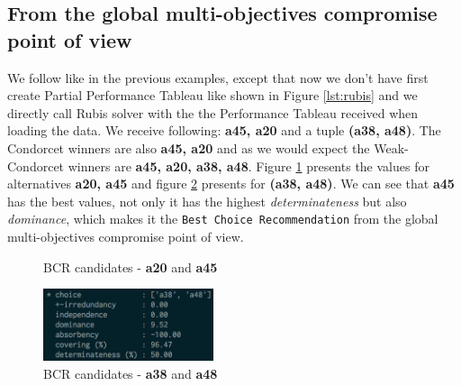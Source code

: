 \documentclass[a4paper]{article}
\begin{document}
\subsection{From the global multi-objectives compromise point of view}
\label{sec:global}

We follow like in the previous examples, except that now we don't have first create Partial Performance Tableau like shown in Figure \ref*{lst:rubis} and we directly call Rubis solver with the the Performance Tableau received when loading the data. We receive following: \textbf{a45, a20} and a tuple \textbf{(a38, a48)}. The Condorcet winners are also \textbf{a45, a20} and as we would expect the Weak-Condorcet winners are \textbf{a45, a20, a38, a48}. Figure \ref{fig:20and45} presents the values for alternatives \textbf{a20, a45} and figure \ref{fig:38_48} presents for \textbf{(a38, a48)}. We can see that \textbf{a45} has the best values, not only it has the highest \emph{determinateness} but also \emph{dominance}, which makes it the \texttt{Best Choice Recommendation} from the global multi-objectives compromise point of view.

\begin{figure}[H]
	\hfill
	\hfill
	\hfill
	\caption{BCR candidates - \textbf{a20} and \textbf{a45}}
	\label{fig:20and45}
\end{figure}

\begin{figure}[H]
	\centering
	\includegraphics[width=5cm]{figures/full_38_48}
	\caption{BCR candidates - \textbf{a38} and \textbf{a48}}
	\label{fig:38_48}
\end{figure}
\end{document}
